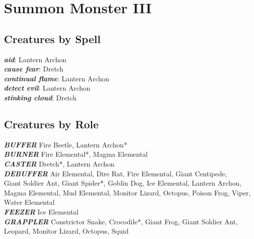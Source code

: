 \newpage

\def \levelnminustwonumsummons{1d4+1}
\def \levelnminusonenumsummons{1d3}
\def \levelnnumsummons{1}

\chapter{Summon Monster III}
\newpage

\section{Creatures by Spell}

\vspace{10pt}

\textbf{\textit{aid}}: Lantern Archon \\
\textbf{\textit{cause fear}}: Dretch \\
\textbf{\textit{continual flame}}: Lantern Archon \\
\textbf{\textit{detect evil}}: Lantern Archon \\
\textbf{\textit{stinking cloud}}: Dretch \\

\newpage

\section{Creatures by Role}

\vspace{5pt}

\textbf{\textit{BUFFER}} Fire Beetle, Lantern Archon* \\

\textbf{\textit{BURNER}} Fire Elemental*, Magma Elemental \\

\textbf{\textit{CASTER}} Dretch*, Lantern Archon \\

\textbf{\textit{DEBUFFER}} Air Elemental, Dire Rat, Fire Elemental, Giant Centipede, \\ Giant Soldier Ant, Giant Spider*, Goblin Dog, Ice Elemental, Lantern Archon, Magma Elemental, Mud Elemental, Monitor Lizard, Octopus, Poison Frog, Viper, Water Elemental \\

\textbf{\textit{FEEZER}} Ice Elemental \\

\textbf{\textit{GRAPPLER}} Constrictor Snake, Crocodile*, Giant Frog, Giant Soldier Ant, Leopard, Monitor Lizard, Octopus, Squid \\

